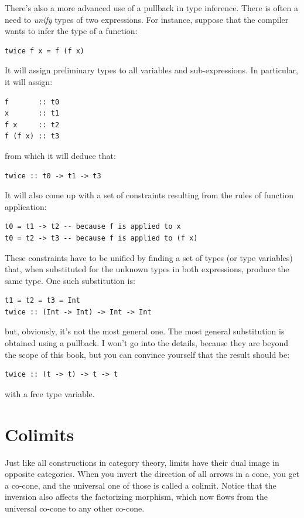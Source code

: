 \noindent
There's also a more advanced use of a pullback in type inference. There
is often a need to \emph{unify} types of two expressions. For instance,
suppose that the compiler wants to infer the type of a function:

\begin{Verbatim}
twice f x = f (f x)
\end{Verbatim}
It will assign preliminary types to all variables and sub-expressions.
In particular, it will assign:

\begin{Verbatim}
f       :: t0
x       :: t1
f x     :: t2
f (f x) :: t3
\end{Verbatim}
from which it will deduce that:

\begin{Verbatim}
twice :: t0 -> t1 -> t3
\end{Verbatim}
It will also come up with a set of constraints resulting from the rules
of function application:

\begin{Verbatim}
t0 = t1 -> t2 -- because f is applied to x 
t0 = t2 -> t3 -- because f is applied to (f x)
\end{Verbatim}
These constraints have to be unified by finding a set of types (or type
variables) that, when substituted for the unknown types in both
expressions, produce the same type. One such substitution is:

\begin{Verbatim}
t1 = t2 = t3 = Int 
twice :: (Int -> Int) -> Int -> Int
\end{Verbatim}
but, obviously, it's not the most general one. The most general
substitution is obtained using a pullback. I won't go into the details,
because they are beyond the scope of this book, but you can convince
yourself that the result should be:

\begin{Verbatim}
twice :: (t -> t) -> t -> t
\end{Verbatim}
with  a free type variable.

\section{Colimits}

Just like all constructions in category theory, limits have their dual
image in opposite categories. When you invert the direction of all
arrows in a cone, you get a co-cone, and the universal one of those is
called a colimit. Notice that the inversion also affects the factorizing
morphism, which now flows from the universal co-cone to any other
co-cone.

